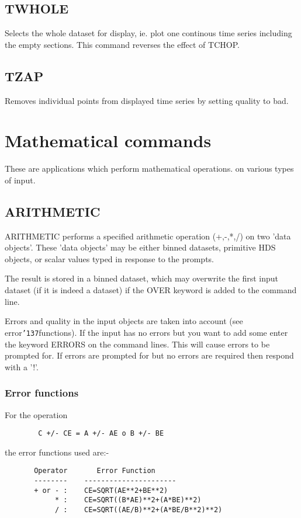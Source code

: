 \documentclass{book}
\renewcommand{\_}{{\tt\char'137}}     %
\begin{document}
\section{TWHOLE}
Selects the whole dataset for display, ie. plot one continous
time series including the empty sections. This command reverses
the effect of TCHOP.
 
\section{TZAP}
Removes individual points from displayed time series by setting
quality to bad.
 
\chapter{Mathematical commands}
These are applications which perform mathematical operations. on
various types of input.
 
\section{ARITHMETIC}
ARITHMETIC performs a specified arithmetic operation (+,-,*,/) on
two 'data objects'. These 'data objects' may be either binned
datasets, primitive HDS objects, or scalar values typed in
response to the prompts.
 
The result is stored in a binned dataset, which may overwrite
the first input dataset (if it is indeed a dataset) if the OVER
keyword is added to the command line.
 
Errors and quality in the input objects are taken into account
(see error\_functions). If the input has no errors but you want to
add some enter the keyword ERRORS on the command lines. This will
cause errors to be prompted for. If errors are prompted for but
no errors are required then respond with a '!'.
 
\subsection{Error functions}
For the operation
\begin{verbatim}
        C +/- CE = A +/- AE o B +/- BE
\end{verbatim}
the error functions used are:-
\begin{verbatim}
       Operator       Error Function
       --------    ----------------------
       + or - :    CE=SQRT(AE**2+BE**2)
            * :    CE=SQRT((B*AE)**2+(A*BE)**2)
            / :    CE=SQRT((AE/B)**2+(A*BE/B**2)**2)
\end{verbatim}
\end{document}
